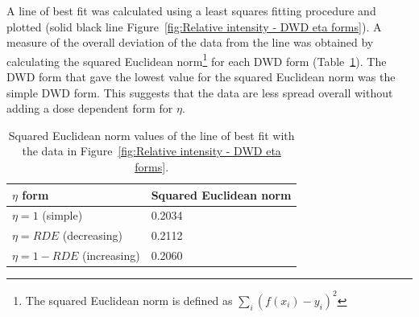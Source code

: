 A line of best fit was calculated using a least squares fitting procedure and plotted (solid black line Figure~\ref{fig:Relative intensity - DWD eta forms}).
A measure of the overall deviation of the data from the line was obtained by calculating the squared Euclidean norm\footnote{The squared Euclidean norm is defined as $\sum_i (f(x_i) - y_i)^2$} for each DWD form (Table~\ref{tab:Squared Euclidean norm values - Relative intensity fits}).
The DWD form that gave the lowest value for the squared Euclidean norm was the simple DWD form.
This suggests that the data are less spread overall without adding a dose dependent form for $\eta$.
\begin{table}[ht!]
\small
\captionsetup{justification=centering}
	\caption[Squared Euclidean norm values representing the scatter of the relative intensity data from the line of best fit.]{Squared Euclidean norm values of the line of best fit with the data in Figure~\ref{fig:Relative intensity - DWD eta forms}.}
	\centering
	\begin{tabular}{p{5cm} p{4.5cm}}
		$\eta$ form			                & Squared Euclidean norm    \\
		\hline
		$\eta = 1$ (simple)     			& 0.2034        \\
		$\eta = RDE$ (decreasing)     	    & 0.2112        \\
		$\eta = 1-RDE$ (increasing)    		& 0.2060       \\
		\hline
	\end{tabular}
	\label{tab:Squared Euclidean norm values - Relative intensity fits}
\end{table}

